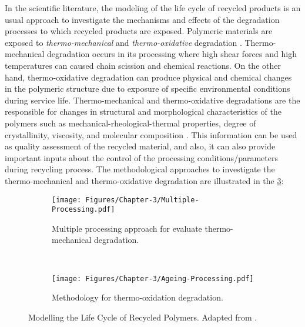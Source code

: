 In the scientific literature, the modeling of the life cycle of recycled products is an usual approach  to investigate the mechanisms and effects of the degradation processes to which recycled products are exposed.
Polymeric materials are exposed to \textit{thermo-mechanical} and \textit{thermo-oxidative} degradation \parencite{Vilaplana2008}.
Thermo-mechanical degradation occurs in its processing where high shear forces and high temperatures can caused chain scission and chemical reactions.
On the other hand, thermo-oxidative degradation can produce physical and chemical changes in the polymeric structure due to exposure of specific environmental conditions during service life. 
Thermo-mechanical and thermo-oxidative degradations are the responsible for changes in structural and morphological characteristics of the polymers such as mechanical-rheological-thermal properties, degree of crystallinity, viscosity, and molecular composition \parencite{Vilaplana2008}.
This information can be used  as quality assessment of the recycled material, and also, it can also provide important inputs about the control of the processing conditions/parameters during recycling process. 
The methodological approaches to investigate the  thermo-mechanical and thermo-oxidative degradation are illustrated in the \ref{Chap-3:Fig.Modelling.Life.Cycle.Recycled.Polymers}:

	\begin{figure}[H]
		\centering

\begin{subfigure}[t]{0.49\textwidth}
			\centering
		\texttt{[image: Figures/Chapter-3/Multiple-Processing.pdf]}
		\caption{Multiple processing approach for evaluate thermo-mechanical degradation.}
		\label{Chap-3:Fig.Multiple.Processing}
\end{subfigure}
~
\begin{subfigure}[t]{0.49\textwidth}
				\centering
	\texttt{[image: Figures/Chapter-3/Ageing-Processing.pdf]}
	\caption{Methodology for thermo-oxidation degradation.}
	\label{Chap-3:Fig.Ageing.Processing}
\end{subfigure}

\caption{Modelling the Life Cycle of Recycled Polymers. Adapted from \parencite{Vilaplana2008}.}
	\label{Chap-3:Fig.Modelling.Life.Cycle.Recycled.Polymers}
	\end{figure}

